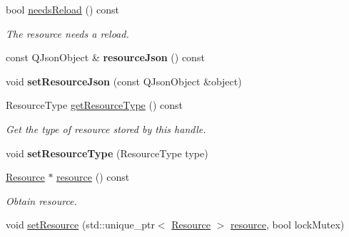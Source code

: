 \begin{Indent}
\begin{DoxyCompactItemize}
\mbox{\label{classrev_1_1_resource_handle_afe00eb31aa16f7c45e21fad1eb5f1a76}} 
bool \mbox{\hyperlink{classrev_1_1_resource_handle_afe00eb31aa16f7c45e21fad1eb5f1a76}{needs\+Reload}} () const
\begin{DoxyCompactList}\small\item\em The resource needs a reload. \end{DoxyCompactList}\item 
\mbox{\label{classrev_1_1_resource_handle_a9550dc57b3ba390f98bf6fd152c36e2f}} 
const Q\+Json\+Object \& {\bfseries resource\+Json} () const
\item 
\mbox{\label{classrev_1_1_resource_handle_a80835b2909e3fe40dc11f02c6b009cf6}} 
void {\bfseries set\+Resource\+Json} (const Q\+Json\+Object \&object)
\item 
\mbox{\label{classrev_1_1_resource_handle_a7d1acd9693a1d7eee8c4851e48ad17de}} 
Resource\+Type \mbox{\hyperlink{classrev_1_1_resource_handle_a7d1acd9693a1d7eee8c4851e48ad17de}{get\+Resource\+Type}} () const
\begin{DoxyCompactList}\small\item\em Get the type of resource stored by this handle. \end{DoxyCompactList}\item 
\mbox{\label{classrev_1_1_resource_handle_a68d5be1ba72aa1ffd52b1ad8d5b1504b}} 
void {\bfseries set\+Resource\+Type} (Resource\+Type type)
\item 
\mbox{\label{classrev_1_1_resource_handle_a0290307e6c4840896dec3ec910935436}} 
\mbox{\hyperlink{classrev_1_1_resource}{Resource}} $\ast$ \mbox{\hyperlink{classrev_1_1_resource_handle_a0290307e6c4840896dec3ec910935436}{resource}} () const
\begin{DoxyCompactList}\small\item\em Obtain resource. \end{DoxyCompactList}\item 
\mbox{\label{classrev_1_1_resource_handle_a228b06bcdf313bc42d53c06460244ba0}} 
void \mbox{\hyperlink{classrev_1_1_resource_handle_a228b06bcdf313bc42d53c06460244ba0}{set\+Resource}} (std\+::unique\+\_\+ptr$<$ \mbox{\hyperlink{classrev_1_1_resource}{Resource}} $>$ \mbox{\hyperlink{classrev_1_1_resource_handle_a0290307e6c4840896dec3ec910935436}{resource}}, bool lock\+Mutex)

\end{DoxyCompactItemize}
\end{Indent}
